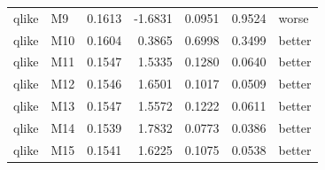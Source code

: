 \begin{tabular}{llrrrrl}
qlike & M9 & 0.1613 & -1.6831 & 0.0951 & 0.9524 & worse \\
qlike & M10 & 0.1604 & 0.3865 & 0.6998 & 0.3499 & better \\
qlike & M11 & 0.1547 & 1.5335 & 0.1280 & 0.0640 & better \\
qlike & M12 & 0.1546 & 1.6501 & 0.1017 & 0.0509 & better \\
qlike & M13 & 0.1547 & 1.5572 & 0.1222 & 0.0611 & better \\
qlike & M14 & 0.1539 & 1.7832 & 0.0773 & 0.0386 & better \\
qlike & M15 & 0.1541 & 1.6225 & 0.1075 & 0.0538 & better \\
\bottomrule
\end{tabular}
